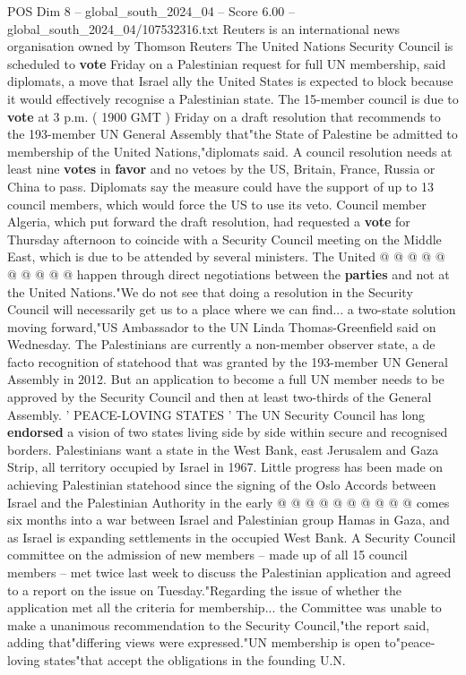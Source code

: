 \begin{textsample}{POS Dim 8 – global\_south\_2024\_04 – Score 6.00 – global\_south\_2024\_04/107532316.txt}  \label{ex:f8_pos_192}
Reuters is an international news organisation owned by Thomson Reuters The United Nations Security Council is scheduled to \textbf{vote} Friday on a Palestinian request for full UN membership, said diplomats, a move that Israel ally the United States is expected to block because it would effectively recognise a Palestinian state.
The 15-member council is due to \textbf{vote} at 3 p.m. ( 1900 GMT ) Friday on a draft resolution that recommends to the 193-member UN General Assembly that"the State of Palestine be admitted to membership of the United Nations,"diplomats said.
A council resolution needs at least nine \textbf{votes} in \textbf{favor} and no vetoes by the US, Britain, France, Russia or China to pass.
Diplomats say the measure could have the support of up to 13 council members, which would force the US to use its veto.
Council member Algeria, which put forward the draft resolution, had requested a \textbf{vote} for Thursday afternoon to coincide with a Security Council meeting on the Middle East, which is due to be attended by several ministers.
The United @ @ @ @ @ @ @ @ @ @ happen through direct negotiations between the \textbf{parties} and not at the United Nations."We do not see that doing a resolution in the Security Council will necessarily get us to a place where we can find... a two-state solution moving forward,"US Ambassador to the UN Linda Thomas-Greenfield said on Wednesday.
The Palestinians are currently a non-member observer state, a de facto recognition of statehood that was granted by the 193-member UN General Assembly in 2012.
But an application to become a full UN member needs to be approved by the Security Council and then at least two-thirds of the General Assembly. ' PEACE-LOVING STATES ' The UN Security Council has long \textbf{endorsed} a vision of two states living side by side within secure and recognised borders.
Palestinians want a state in the West Bank, east Jerusalem and Gaza Strip, all territory occupied by Israel in 1967.
Little progress has been made on achieving Palestinian statehood since the signing of the Oslo Accords between Israel and the Palestinian Authority in the early @ @ @ @ @ @ @ @ @ @ comes six months into a war between Israel and Palestinian group Hamas in Gaza, and as Israel is expanding settlements in the occupied West Bank.
A Security Council committee on the admission of new members -- made up of all 15 council members -- met twice last week to discuss the Palestinian application and agreed to a report on the issue on Tuesday."Regarding the issue of whether the application met all the criteria for membership... the Committee was unable to make a unanimous recommendation to the Security Council,"the report said, adding that"differing views were expressed."UN membership is open to"peace-loving states"that accept the obligations in the founding U.N.

\end{textsample}
